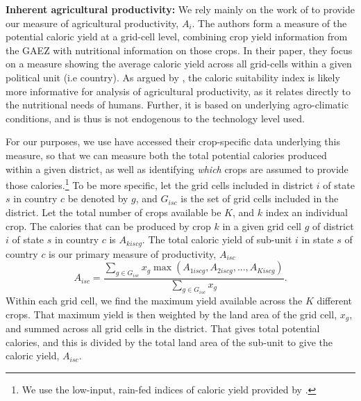\documentclass[11pt]{article}
\begin{document}
\vspace{.5cm}\noindent\textbf{Inherent agricultural productivity:} We rely mainly on the work of \citet{galorozak2016} to provide our measure of agricultural productivity, $A_i$. The authors form a measure of the potential caloric yield at a grid-cell level, combining crop yield information from the GAEZ with nutritional information on those crops. In their paper, they focus on a measure showing the average caloric yield across all grid-cells within a given political unit (i.e country). As argued by \citet{galorozak2016}, the caloric suitability index is likely more informative for analysis of agricultural productivity, as it relates directly to the nutritional needs of humans. Further, it is based on underlying agro-climatic conditions, and is thus is not endogenous to the technology level used.

For our purposes, we use have accessed their crop-specific data underlying this measure, so that we can measure both the total potential calories produced within a given district, as well as identifying \textit{which} crops are assumed to provide those calories.\footnote{We use the low-input, rain-fed indices of caloric yield provided by \citet{galorozak2016}.} To be more specific, let the grid cells included in district $i$ of state $s$ in country $c$ be denoted by $g$, and $G_{isc}$ is the set of grid cells included in the district. Let the total number of crops available be $K$, and $k$ index an individual crop. The calories that can be produced by crop $k$ in a given grid cell $g$ of district $i$ of state $s$ in country $c$ is $A_{kiscg}$. The total caloric yield of sub-unit $i$ in state $s$ of country $c$ is our primary measure of productivity, $A_{isc}$
\begin{equation}
	A_{isc} = \frac{\sum_{g \in G_{isc}} x_g \max\left(A_{1iscg}, A_{2iscg}, ..., A_{Kiscg}\right)}{\sum_{g \in G_{isc}} x_g}.
\end{equation}
Within each grid cell, we find the maximum yield available across the $K$ different crops. That maximum yield is then weighted by the land area of the grid cell, $x_g$, and summed across all grid cells in the district. That gives total potential calories, and this is divided by the total land area of the sub-unit to give the caloric yield, $A_{isc}$.
\end{document}
